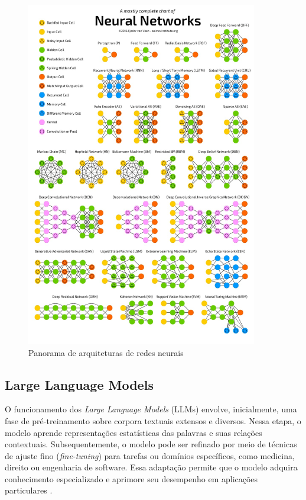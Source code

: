 \begin{figure}[!htbp]
  \centering
  \includegraphics[width=0.9\textwidth]{imgs/neural_networks.jpeg}
  \caption{Panorama de arquiteturas de redes neurais \cite{asimov2017}}
  \label{fig:nnzoo}
\end{figure}

\FloatBarrier
\subsection{Large Language Models}

O funcionamento dos \textit{Large Language Models} (LLMs) envolve, inicialmente, uma fase de pré-treinamento sobre corpora textuais extensos e diversos. Nessa etapa, o modelo aprende representações estatísticas das palavras e suas relações contextuais. Subsequentemente, o modelo pode ser refinado por meio de técnicas de ajuste fino (\textit{fine-tuning}) para tarefas ou domínios específicos, como medicina, direito ou engenharia de software. Essa adaptação permite que o modelo adquira conhecimento especializado e aprimore seu desempenho em aplicações particulares \cite{jelodar2025, ouyang2023}.

